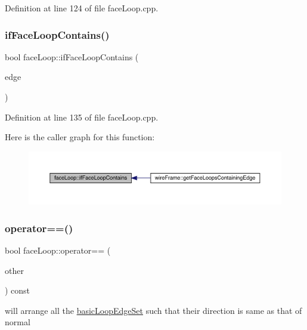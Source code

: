 Definition at line 124 of file face\+Loop.\+cpp.

\mbox{\label{classface_loop_a3ed69fdb3554a255f484fa78fd1f3361}} 
\subsubsection{\texorpdfstring{if\+Face\+Loop\+Contains()}{ifFaceLoopContains()}}
{\footnotesize\ttfamily bool face\+Loop\+::if\+Face\+Loop\+Contains (\begin{DoxyParamCaption}\item[{\mbox{\hyperlink{structedge3_d}{edge3D}}}]{edge }\end{DoxyParamCaption})}



Definition at line 135 of file face\+Loop.\+cpp.

Here is the caller graph for this function\+:
\nopagebreak
\begin{figure}[H]
\begin{center}
\leavevmode
\includegraphics[width=350pt]{classface_loop_a3ed69fdb3554a255f484fa78fd1f3361_icgraph}
\end{center}
\end{figure}
\mbox{\label{classface_loop_a603c5cfde9765657af9cf088df8fc474}} 
\subsubsection{\texorpdfstring{operator==()}{operator==()}}
{\footnotesize\ttfamily bool face\+Loop\+::operator== (\begin{DoxyParamCaption}\item[{\mbox{\hyperlink{classface_loop}{face\+Loop}}}]{other }\end{DoxyParamCaption}) const}

will arrange all the \mbox{\hyperlink{classbasic_loop_edge_set}{basic\+Loop\+Edge\+Set}} such that their direction is same as that of normal 

